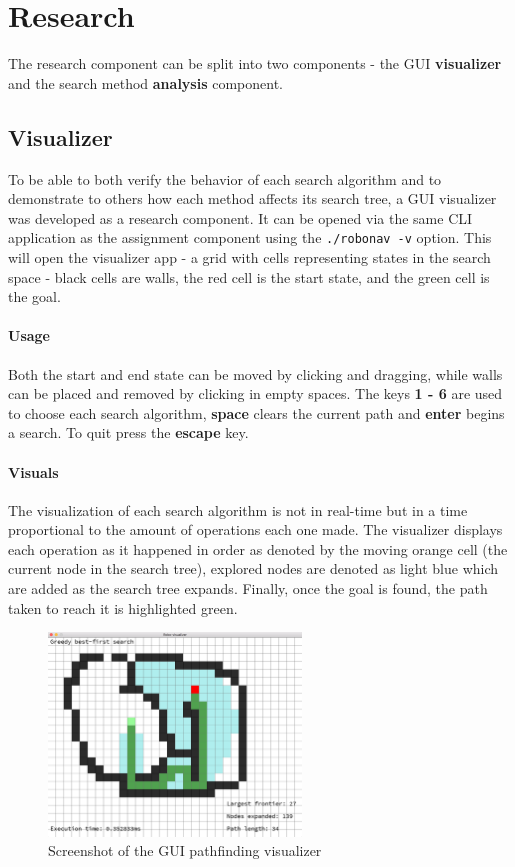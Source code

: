 \section{Research} %
\label{sec:research}
The research component can be split into two components - the GUI \textbf{visualizer} and the search method \textbf{analysis} component.

\subsection{Visualizer} %
\label{sub:visualizer}
To be able to both verify the behavior of each search algorithm and to demonstrate to others how each method affects its search tree, a GUI visualizer was developed as a research component. It can be opened via the same CLI application as the assignment component using the \texttt{./robonav -v} option. This will open the visualizer app - a grid with cells representing states in the search space - black cells are walls, the red cell is the start state, and the green cell is the goal.

\paragraph{Usage} %
\label{par:usage}
Both the start and end state can be moved by clicking and dragging, while walls can be placed and removed by clicking in empty spaces. The keys \textbf{1 - 6} are used to choose each search algorithm, \textbf{space} clears the current path and \textbf{enter} begins a search. To quit press the \textbf{escape} key.

\paragraph{Visuals} %
\label{par:visuals}
The visualization of each search algorithm is not in real-time but in a time proportional to the amount of operations each one made. The visualizer displays each operation as it happened in order as denoted by the moving orange cell (the current node in the search tree), explored nodes are denoted as light blue which are added as the search tree expands. Finally, once the goal is found, the path taken to reach it is highlighted green.

\begin{figure}[H]
	\centering
	\includegraphics[width=0.6\textwidth]{Resources/vis.png}
	\caption{Screenshot of the GUI pathfinding visualizer}
\end{figure}

